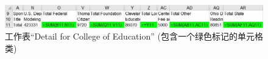 \begin{figure}[tbp]
    \centering
    \includegraphics[width = \columnwidth]{figure/figure7.jpeg}
    \caption{工作表“Detail for College of Education” (包含一个绿色标记的单元格类)}
    \label{figure7}
\end{figure}
